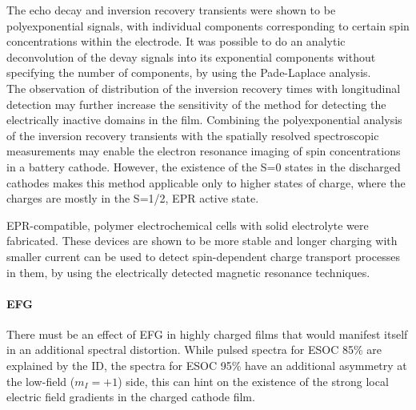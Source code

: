 The echo decay and inversion recovery transients were shown to be polyexponential signals, with individual components corresponding to certain spin concentrations within the electrode. It was possible to do an analytic deconvolution of the devay signals into its exponential components without specifying the number of components, by using the Pade-Laplace analysis.\\

The observation of distribution of the inversion recovery times with longitudinal detection may further increase the sensitivity of the method for detecting the electrically inactive domains in the film. Combining the polyexponential analysis of the inversion recovery transients with the spatially resolved spectroscopic measurements may enable the electron resonance imaging of spin concentrations in a battery cathode. However, the existence of the S=0 states in the discharged cathodes makes this method applicable only to higher states of charge, where the charges are mostly in the S=1/2, EPR active state.


EPR-compatible, polymer electrochemical cells with solid electrolyte were fabricated. These devices are shown to be more stable and longer charging with smaller current can be used to detect spin-dependent charge transport processes in them, by using the electrically detected magnetic resonance techniques.\\

\paragraph{EFG}
There must be an effect of EFG in highly charged films that would manifest itself in an additional spectral distortion. While pulsed spectra for ESOC 85\% are explained by the ID, the spectra for ESOC 95\% have an additional asymmetry at the low-field ($m_I=+1$) side, this can hint on the existence of the strong local electric field gradients in the charged cathode film.





